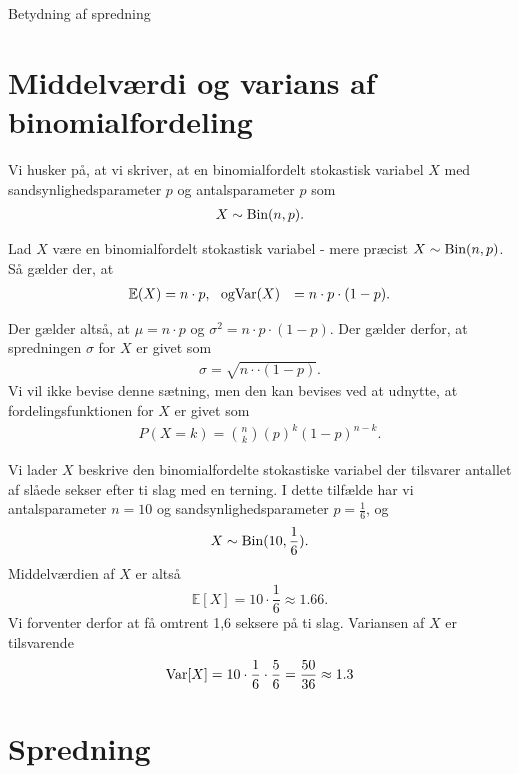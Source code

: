 \begin{center}
\Huge
Betydning af spredning
\end{center}

\section*{Middelværdi og varians af binomialfordeling}
Vi husker på, at vi skriver, at en binomialfordelt stokastisk variabel $X$ med sandsynlighedsparameter $p$ og antalsparameter $p$ som
\begin{align*}
X \sim \textnormal{Bin}(n,p).
\end{align*}

\begin{setn}
Lad $X$ være en binomialfordelt stokastisk variabel - mere præcist $X \sim \textnormal{Bin}(n,p)$. Så gælder der, at 
\begin{align*}
\mathbb{E}(X) &= n\cdot p,\ \textnormal{ og}
\textnormal{Var}(X) &= n\cdot p\cdot (1-p). 
\end{align*} 
\end{setn}
Der gælder altså, at $\mu = n\cdot p$ og $\sigma^2 = n\cdot p\cdot (1-p)$. Der gælder derfor, at spredningen $\sigma$ for $X$ er givet som
\begin{align*}
\sigma = \sqrt{n\cdotp\cdot(1-p)}.
\end{align*}
Vi vil ikke bevise denne sætning, men den kan bevises ved at udnytte, at fordelingsfunktionen for $X$ er givet som
\begin{align*}
P(X = k) = \binom{n}{k}(p)^k(1-p)^{n-k}.
\end{align*}
\begin{exa}
Vi lader $X$ beskrive den binomialfordelte stokastiske variabel der tilsvarer antallet af slåede sekser efter ti slag med en terning. I dette tilfælde har vi antalsparameter $n = 10$ og sandsynlighedsparameter $p = \frac{1}{6}$, og 
\begin{align*}
X \sim \textnormal{Bin}(10,\frac{1}{6}). 
\end{align*}
Middelværdien af $X$ er altså
\[
\mathbb{E}[X] = 10\cdot \frac{1}{6} \approx 1.66.
\]
Vi forventer derfor at få omtrent 1,6 seksere på ti slag.
Variansen af $X$ er tilsvarende
\begin{align*}
\textnormal{Var}[X] = 10\cdot \frac{1}{6}\cdot \frac{5}{6} = \frac{50}{36} \approx 1.3
\end{align*}
\end{exa}

\section*{Spredning}

